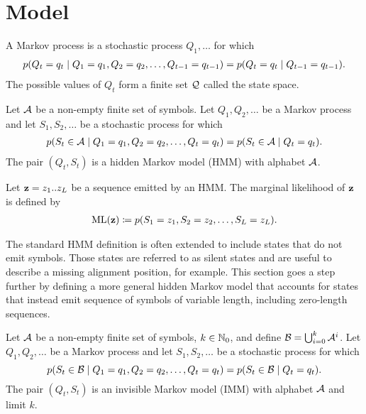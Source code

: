 \section{Model}

\begin{definition}\label{def:mp}
  A Markov process is a stochastic process $Q_1, \dots$ for which
  \begin{align*}
    p(Q_t=q_t \;|\; Q_1=q_1, Q_2=q_2, \dots, Q_{t-1}=q_{t-1}) = p(Q_t=q_t \;|\; Q_{t-1}=q_{t-1}).
  \end{align*}
  The possible values of $Q_t$ form a finite set $\mathcal{Q}$ called the state space.
\end{definition}

\begin{definition}\label{def:hmm}
  Let $\mathcal{A}$ be a non-empty finite set of symbols. Let $Q_1, Q_2, \dots$ be a Markov process and
  let $S_1, S_2, \dots$ be a stochastic process for which
  \begin{align*}
    p(S_t\in\mathcal{A} \;|\; Q_1=q_1, Q_2=q_2, \dots, Q_t=q_t) = p(S_t\in\mathcal{A} \;|\; Q_t=q_t).
  \end{align*}
  The pair $(Q_t, S_t)$ is a hidden Markov model (HMM) with alphabet $\mathcal{A}$.
\end{definition}

Let $\mathbf{z}=z_1 .. z_L$ be a sequence emitted by an HMM.
The marginal likelihood of $\mathbf{z}$ is defined by
\begin{align}\label{eq:hml}
  \mathrm{ML}(\mathbf{z}) \coloneqq p(S_1=z_1, S_2=z_2, \dots, S_L=z_L).
\end{align}

The standard HMM definition is often extended to include states that do not emit symbols. Those
states are referred to as silent states and are useful to describe a missing alignment position, for
example. This section goes a step further by defining a more general hidden Markov model that
accounts for states that instead emit sequence of symbols of variable length, including zero-length
sequences.

\begin{definition}
  Let $\mathcal{A}$ be a non-empty finite set of symbols, $k\in\mathbb{N}_0$, and define
  $\mathcal{B}=\bigcup_{i=0}^k\mathcal{A}^i$.
  Let $Q_1, Q_2, \dots$ be a Markov process and let $S_1, S_2, \dots$ be a stochastic process for
  which
  \begin{equation*}
    p(S_t\in\mathcal{B} \;|\; Q_1=q_1, Q_2=q_2, \dots, Q_t=q_t)
    = p(S_t\in\mathcal{B} \;|\; Q_t=q_t).
  \end{equation*}
  The pair $(Q_t, S_t)$ is an invisible Markov model (IMM) with alphabet $\mathcal{A}$ and
  limit $k$.
\end{definition}

